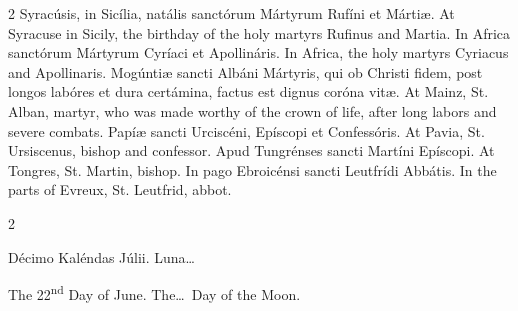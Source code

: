 \begin{paracol}{2}
Syracúsis, in Sicília, 
 natális sanctórum Mártyrum Rufíni et Mártiæ.
\switchcolumn
{}
At Syracuse in Sicily, the birthday 
 of the holy martyrs Rufinus and Martia.
\switchcolumn*
{}
In Africa sanctórum 
 Mártyrum Cyríaci et Apollináris.
\switchcolumn
{}
In Africa, the holy martyrs Cyriacus 
 and Apollinaris.
\switchcolumn*
{}
Mogúntiæ sancti Albáni 
 Mártyris, qui ob Christi fidem, post longos labóres et dura certámina, 
 factus est dignus coróna vitæ.
\switchcolumn
{}
At Mainz, St. Alban, martyr, who was 
 made worthy of the crown of life, after long labors and severe combats.
\switchcolumn*
{}
Papíæ sancti Urciscéni, 
 Epíscopi et Confessóris.
\switchcolumn
{}
At Pavia, St. Ursiscenus, bishop and 
 confessor.
\switchcolumn*
{}
Apud Tungrénses sancti 
 Martíni Epíscopi.
\switchcolumn
{}
At Tongres, St. Martin, bishop.
\switchcolumn*
{}
In pago Ebroicénsi 
 sancti Leutfrídi Abbátis.
\switchcolumn
{}
In the parts of Evreux, St. Leutfrid, 
 abbot.
\switchcolumn*
{}
\end{paracol}


\begin{paracol}{2}
\begin{center}{\color{gregoriocolor} Décimo Kaléndas Júlii. 
 Luna\dots\ }\end{center}
\switchcolumn
{}
\begin{center}{\color{gregoriocolor} The 
 22\textsuperscript{nd} Day of 
 June. The\dots\ Day of the Moon.}\end{center}
\end{paracol}

